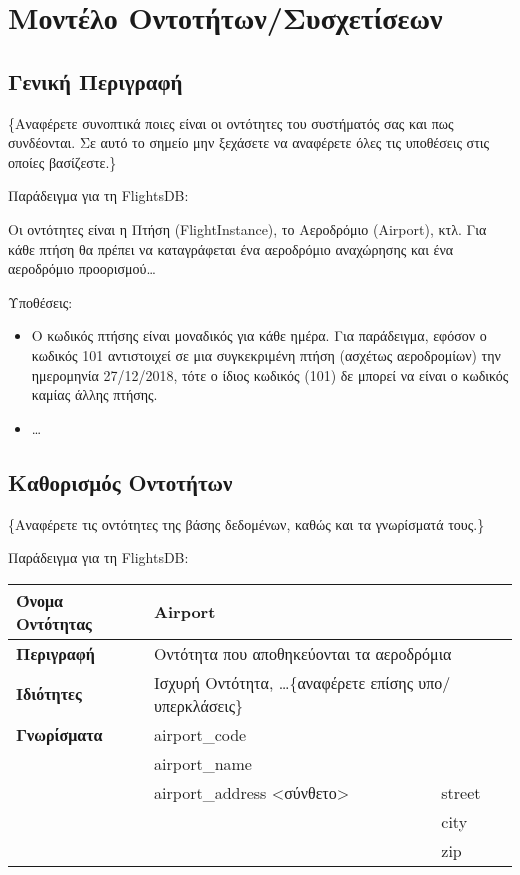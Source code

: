 \section{Μοντέλο Οντοτήτων/Συσχετίσεων}

\subsection{Γενική Περιγραφή}

\{Αναφέρετε συνοπτικά ποιες είναι οι οντότητες του συστήματός σας και
πως συνδέονται. Σε αυτό το σημείο μην ξεχάσετε να αναφέρετε όλες τις
υποθέσεις στις οποίες βασίζεστε.\}

Παράδειγμα για τη FlightsDB:

Οι οντότητες είναι η Πτήση (FlightInstance), το Αεροδρόμιο (Airport),
κτλ. Για κάθε πτήση θα πρέπει να καταγράφεται ένα αεροδρόμιο
αναχώρησης και ένα αεροδρόμιο προορισμού…

Υποθέσεις:
\begin{itemize}[noitemsep]
\item Ο κωδικός πτήσης είναι μοναδικός για κάθε ημέρα. Για παράδειγμα,
  εφόσον ο κωδικός 101 αντιστοιχεί σε μια συγκεκριμένη πτήση (ασχέτως
  αεροδρομίων) την ημερομηνία 27/12/2018, τότε ο ίδιος κωδικός (101)
  δε μπορεί να είναι ο κωδικός καμίας άλλης πτήσης.
\item \ldots
\end{itemize}

\subsection{Καθορισμός Οντοτήτων}

\{Αναφέρετε τις οντότητες της βάσης δεδομένων, καθώς και τα γνωρίσματά
τους.\}

Παράδειγμα για τη FlightsDB:

\begin{tabular}{|l|l|l|}
  \hline
  \textbf{Όνομα Οντότητας} &\multicolumn{2}{|l|}{Airport}\\ \hline
  \textbf{Περιγραφή}&\multicolumn{2}{|l|}{Οντότητα που αποθηκεύονται τα αεροδρόμια}\\ \hline
  \textbf{Ιδιότητες}&\multicolumn{2}{|l|}{Ισχυρή Οντότητα, \ldots \{αναφέρετε επίσης υπο/υπερκλάσεις\}}\\ \hline
  \textbf{Γνωρίσματα}&\multicolumn{2}{|l|}{airport\_code} \\ \cline{2-3}
                          &\multicolumn{2}{|l|}{airport\_name}\\
  \cline{2-3}
                           &airport\_address <σύνθετο>&street \\
  \cline{3-3}
                           &&city \\ \cline{3-3}
                           &&zip \\ \hline
\end{tabular}

